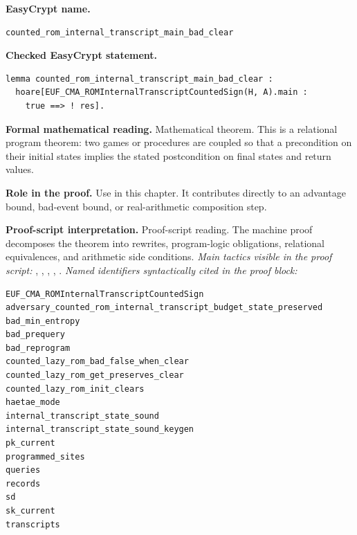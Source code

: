 \begin{formaltheorem}
\end{formaltheorem}

\begin{formaltheorem}
\noindent\textbf{EasyCrypt name.}
\begin{lstlisting}[language=EasyCrypt,basicstyle=\ttfamily\scriptsize]
counted_rom_internal_transcript_main_bad_clear
\end{lstlisting}
\noindent\textbf{Checked EasyCrypt statement.}
\begin{lstlisting}[language=EasyCrypt,basicstyle=\ttfamily\scriptsize]
lemma counted_rom_internal_transcript_main_bad_clear :
  hoare[EUF_CMA_ROMInternalTranscriptCountedSign(H, A).main :
    true ==> ! res].
\end{lstlisting}
\noindent\textbf{Formal mathematical reading.}
Mathematical theorem. This is a relational program theorem: two games or procedures are coupled so that a precondition on their initial states implies the stated postcondition on final states and return values.

\noindent\textbf{Role in the proof.}
Use in this chapter. It contributes directly to an advantage bound, bad-event bound, or real-arithmetic composition step.

\noindent\textbf{Proof-script interpretation.}
Proof-script reading. The machine proof decomposes the theorem into rewrites, program-logic obligations, relational equivalences, and arithmetic side conditions.
\emph{Main tactics visible in the proof script:} , , , , .
\emph{Named identifiers syntactically cited in the proof block:}
\begin{lstlisting}[language=EasyCrypt,basicstyle=\ttfamily\scriptsize]
EUF_CMA_ROMInternalTranscriptCountedSign
adversary_counted_rom_internal_transcript_budget_state_preserved
bad_min_entropy
bad_prequery
bad_reprogram
counted_lazy_rom_bad_false_when_clear
counted_lazy_rom_get_preserves_clear
counted_lazy_rom_init_clears
haetae_mode
internal_transcript_state_sound
internal_transcript_state_sound_keygen
pk_current
programmed_sites
queries
records
sd
sk_current
transcripts
\end{lstlisting}

\end{formaltheorem}

